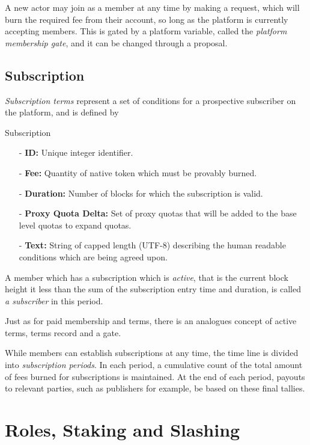 \documentclass{article}
\newenvironment{concept_box}[1]
    {
    \begin{tcolorbox}
    {\large \textbf{#1} }
    }
    {
    \end{tcolorbox}
    }
\begin{document}
A new actor may join as a member at any time by making a request, which will burn the required fee from their account, so long as the platform is currently accepting members. This is gated by a platform variable, called the \textit{platform membership gate}, and it can be changed through a proposal.

\subsection{Subscription} \label{sec:subscription}

\textit{Subscription terms} represent a set of conditions for a prospective subscriber on the platform, and is defined by \\

\begin{concept_box}{Subscription}
    \begin{itemize}
      \item[-] \textbf{ID:} Unique integer identifier.
      \item[-] \textbf{Fee:} Quantity of native token which must be provably burned.
      \item[-] \textbf{Duration:} Number of blocks for which the subscription is valid.
      \item[-] \textbf{Proxy Quota Delta:} Set of proxy quotas that will be added to the base level quotas to expand quotas.
      \item[-] \textbf{Text:} String of capped length (UTF-8) describing the human readable conditions which are being agreed upon.
    \end{itemize}
\end{concept_box}

A member which has a subscription which is \textit{active}, that is the current block height it less than the sum of the subscription entry time and duration, is called \textit{a subscriber} in this period.

Just as for paid membership and terms, there is an analogues concept of active terms, terms record and a gate.

While members can establish subscriptions at any time, the time line is divided into \textit{subscription periods}. In each period, a cumulative count of the total amount of fees burned for subscriptions is maintained. At the end of each period, payouts to relevant parties, such as publishers for example, be based on these final tallies.

\section{Roles, Staking and Slashing} \label{sec:roles_staking_and_slashing}
\end{document}
